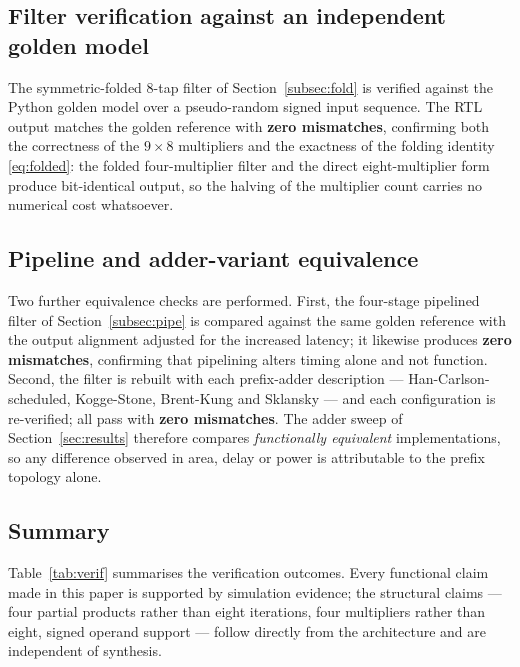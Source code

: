 \documentclass[conference]{IEEEtran}
\begin{document}
\subsection{Filter verification against an independent golden model}

The symmetric-folded 8-tap filter of Section~\ref{subsec:fold} is
verified against the Python golden model over a pseudo-random signed
input sequence. The RTL output matches the golden reference with
\textbf{zero mismatches}, confirming both the correctness of the
$9 \times 8$ multipliers and the exactness of the folding identity
\eqref{eq:folded}: the folded four-multiplier filter and the direct
eight-multiplier form produce bit-identical output, so the halving of
the multiplier count carries no numerical cost whatsoever.

\subsection{Pipeline and adder-variant equivalence}

Two further equivalence checks are performed. First, the four-stage
pipelined filter of Section~\ref{subsec:pipe} is compared against the
same golden reference with the output alignment adjusted for the
increased latency; it likewise produces \textbf{zero mismatches},
confirming that pipelining alters timing alone and not function.
Second, the filter is rebuilt with each prefix-adder description ---
Han-Carlson-scheduled, Kogge-Stone, Brent-Kung and Sklansky --- and each
configuration is re-verified; all pass with \textbf{zero mismatches}.
The adder sweep of Section~\ref{sec:results} therefore compares
\emph{functionally equivalent} implementations, so any difference
observed in area, delay or power is attributable to the prefix topology
alone.

\subsection{Summary}

Table~\ref{tab:verif} summarises the verification outcomes. Every
functional claim made in this paper is supported by simulation
evidence; the structural claims --- four partial products rather than
eight iterations, four multipliers rather than eight, signed operand
support --- follow directly from the architecture and are independent
of synthesis.
\end{document}
